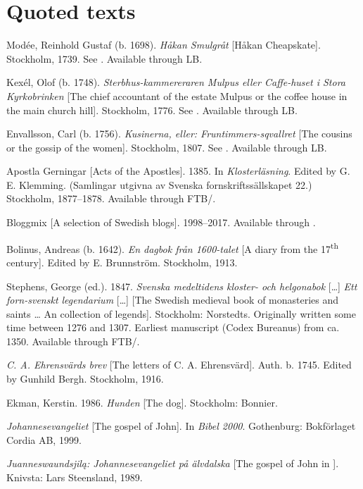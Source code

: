 \documentclass[output=paper]{langscibook}
\begin{document}
\section*{Quoted texts}
\begin{description}[font=\normalfont]\sloppy
\item[1dSMUL:] Modée, Reinhold Gustaf (b. 1698). \textit{Håkan Smulgråt} [Håkan Cheapskate]. Stockholm, 1739. See  \citet{MarttalaStromquist2001}. Available through LB.
\item[2aSTERBH:] Kexél, Olof (b. 1748). \textit{Sterbhus-kammereraren Mulpus eller Caffe-huset i Stora Kyrkobrinken} [The chief accountant of the estate Mulpus or the coffee house in the main church hill]. Stockholm, 1776. See \citet{MarttalaStromquist2001}. Available through LB.
\item[2cKUSINE:] Envallsson, Carl (b. 1756). \textit{Kusinerna, eller: Fruntimmers-sqvallret} [The cousins or the gossip of the women]. Stockholm, 1807. See \citet{MarttalaStromquist2001}. Available through LB.
\item[ApG:] Apostla Gerningar [Acts of the Apostles]. 1385. In \textit{Klosterläsning}. Edited by G. E. Klemming. (Samlingar utgivna av Svenska fornskriftssällskapet 22.) Stockholm, 1877–1878. Available through FTB\slash {}.
\item[Blogg:] Bloggmix [A selection of Swedish blogs]. 1998–2017. Available through .
\item[Bol:] Bolinus, Andreas (b. 1642). \textit{En dagbok från 1600-talet} [A diary from the 17\textsuperscript{th} century]. Edited by E. Brunnström. Stockholm, 1913. 
\item[Leg:] Stephens, George (ed.). 1847. \textit{Svenska medeltidens kloster- och helgonabok} […] \textit{Ett forn-svenskt legendarium} […] [The Swedish medieval book of monasteries and saints … An  collection of legends]. Stockholm: Norstedts. Originally written some time between 1276 and 1307. Earliest manuscript (Codex Bureanus) from ca. 1350. Available through FTB\slash {}.
\item[Ehrensvärd:] \textit{C. A. Ehrensvärds brev} [The letters of C. A. Ehrensvärd]. Auth. b. 1745. Edited by Gunhild Bergh. Stockholm, 1916.
\item[Hunden:] Ekman, Kerstin. 1986. \textit{Hunden} [The dog]. Stockholm: Bonnier. 
\item[Joh.:] \textit{Johannesevangeliet} [The gospel of John]. In \textit{Bibel 2000}. Gothenburg: Bokförlaget Cordia AB, 1999. 
\item[Jua.:] \textit{Juanneswaundsjilą: Johannesevangeliet på älvdalska} [The gospel of John in ]. Knivsta: Lars Steensland, 1989.

\end{description}
\end{document}

